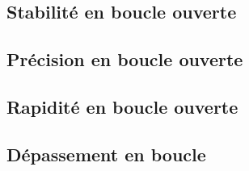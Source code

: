 \subsection{Stabilité en boucle ouverte}

\subsection{Précision en boucle ouverte}

\subsection{Rapidité en boucle ouverte}

\subsection{Dépassement en boucle }








